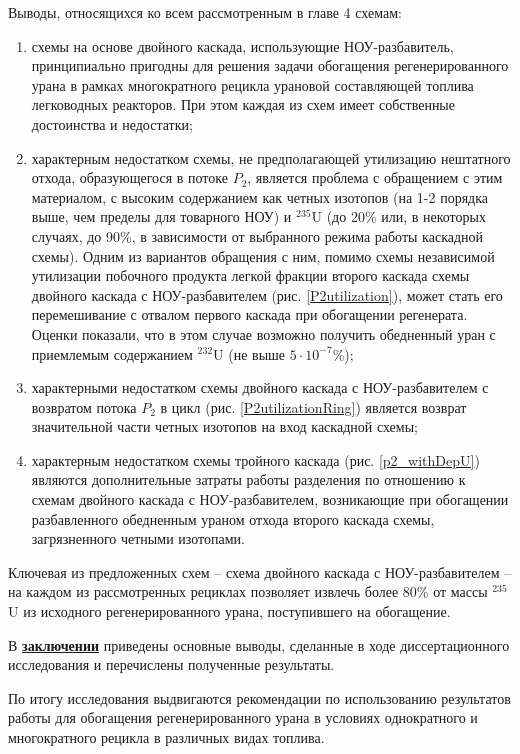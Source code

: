 Выводы, относящихся ко всем рассмотренным в главе 4 схемам:
\begin{enumerate}
    \item схемы на основе двойного каскада, использующие НОУ-разбавитель, принципиально пригодны для решения задачи обогащения регенерированного урана в рамках многократного рецикла урановой составляющей топлива легководных реакторов. При этом каждая из схем имеет собственные достоинства и недостатки;
    \item характерным недостатком схемы, не предполагающей утилизацию нештатного отхода, образующегося в потоке $P_2$, является проблема с обращением с этим материалом, с высоким содержанием как четных изотопов (на 1-2 порядка выше, чем пределы для товарного НОУ) и $^{235}$U (до 20\% или, в некоторых случаях, до 90\%, в зависимости от выбранного режима работы каскадной схемы). Одним из вариантов обращения с ним, помимо схемы независимой утилизации побочного продукта легкой фракции второго каскада схемы двойного каскада с НОУ-разбавителем (рис. \ref{P2utilization}), может стать его перемешивание с отвалом первого каскада при обогащении регенерата. Оценки показали, что в этом случае возможно получить обедненный уран с приемлемым содержанием $^{232}$U (не выше $5\cdot10^{-7}$\%);
    \item характерными недостатком схемы двойного каскада с НОУ-разбавителем с возвратом потока $P_2$ в цикл (рис. \ref{P2utilizationRing}) является возврат значительной части четных изотопов на вход каскадной схемы;
    \item характерным недостатком схемы тройного каскада (рис. \ref{p2_withDepU}) являются дополнительные затраты работы разделения по отношению к схемам двойного каскада с НОУ-разбавителем, возникающие при обогащении разбавленного обедненным ураном отхода второго каскада схемы, загрязненного четными изотопами.
  \end{enumerate}

Ключевая из предложенных схем -- схема двойного каскада с НОУ-разбавителем -- на каждом из рассмотренных рециклах позволяет извлечь более 80\% от массы $^{235}$U из исходного регенерированного урана, поступившего на обогащение.

В \underline{\textbf{заключении}} приведены основные выводы, сделанные в ходе диссертационного исследования и перечислены полученные результаты.

По итогу исследования выдвигаются рекомендации по использованию результатов работы для обогащения регенерированного урана в условиях однократного и многократного рецикла в различных видах топлива.

